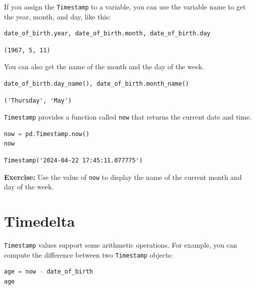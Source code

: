 If you assign the \passthrough{\lstinline!Timestamp!} to a variable, you
can use the variable name to get the year, month, and day, like this:

\begin{lstlisting}[language=Python,style=source]
date_of_birth.year, date_of_birth.month, date_of_birth.day
\end{lstlisting}

\begin{lstlisting}[style=output]
(1967, 5, 11)
\end{lstlisting}

You can also get the name of the month and the day of the week.

\begin{lstlisting}[language=Python,style=source]
date_of_birth.day_name(), date_of_birth.month_name()
\end{lstlisting}

\begin{lstlisting}[style=output]
('Thursday', 'May')
\end{lstlisting}

\passthrough{\lstinline!Timestamp!} provides a function called
\passthrough{\lstinline!now!} that returns the current date and time.

\begin{lstlisting}[language=Python,style=source]
now = pd.Timestamp.now()
now
\end{lstlisting}

\begin{lstlisting}[style=output]
Timestamp('2024-04-22 17:45:11.077775')
\end{lstlisting}

\textbf{Exercise:} Use the value of \passthrough{\lstinline!now!} to
display the name of the current month and day of the week.

\hypertarget{timedelta}{%
\section{Timedelta}\label{timedelta}}

\passthrough{\lstinline!Timestamp!} values support some arithmetic
operations. For example, you can compute the difference between two
\passthrough{\lstinline!Timestamp!} objects:

\begin{lstlisting}[language=Python,style=source]
age = now - date_of_birth
age
\end{lstlisting}

